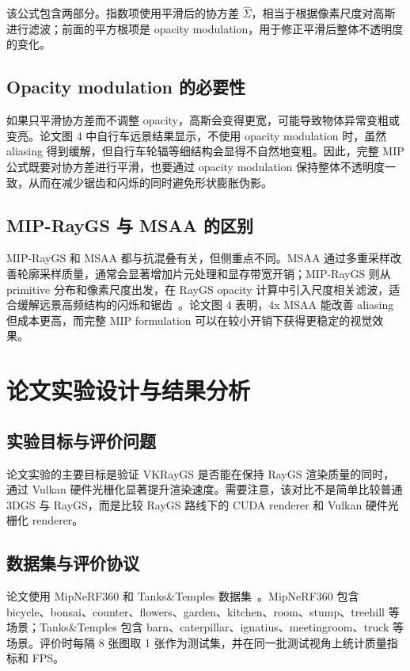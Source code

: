 \documentclass[12pt,hyperref,a4paper,UTF8]{ctexart}
\begin{document}
该公式包含两部分。指数项使用平滑后的协方差 $\hat{\Sigma}$，相当于根据像素尺度对高斯进行滤波；前面的平方根项是 opacity modulation，用于修正平滑后整体不透明度的变化。



\subsection{Opacity modulation 的必要性}
如果只平滑协方差而不调整 opacity，高斯会变得更宽，可能导致物体异常变粗或变亮。论文图 4 中自行车远景结果显示，不使用 opacity modulation 时，虽然 aliasing 得到缓解，但自行车轮辐等细结构会显得不自然地变粗。因此，完整 MIP 公式既要对协方差进行平滑，也要通过 opacity modulation 保持整体不透明度一致，从而在减少锯齿和闪烁的同时避免形状膨胀伪影。



\subsection{MIP-RayGS 与 MSAA 的区别}
MIP-RayGS 和 MSAA 都与抗混叠有关，但侧重点不同。MSAA 通过多重采样改善轮廓采样质量，通常会显著增加片元处理和显存带宽开销；MIP-RayGS 则从 primitive 分布和像素尺度出发，在 RayGS opacity 计算中引入尺度相关滤波，适合缓解远景高频结构的闪烁和锯齿~\cite{mipsplatting}。论文图 4 表明，4x MSAA 能改善 aliasing 但成本更高，而完整 MIP formulation 可以在较小开销下获得更稳定的视觉效果。



\section{论文实验设计与结果分析}
\subsection{实验目标与评价问题}
论文实验的主要目标是验证 VKRayGS 是否能在保持 RayGS 渲染质量的同时，通过 Vulkan 硬件光栅化显著提升渲染速度。需要注意，该对比不是简单比较普通 3DGS 与 RayGS，而是比较 RayGS 路线下的 CUDA renderer 和 Vulkan 硬件光栅化 renderer。



\subsection{数据集与评价协议}
论文使用 MipNeRF360 和 Tanks\&Temples 数据集~\cite{mipnerf360,tanksandtemples}。MipNeRF360 包含 bicycle、bonsai、counter、flowers、garden、kitchen、room、stump、treehill 等场景；Tanks\&Temples 包含 barn、caterpillar、ignatius、meetingroom、truck 等场景。评价时每隔 8 张图取 1 张作为测试集，并在同一批测试视角上统计质量指标和 FPS。
\end{document}
